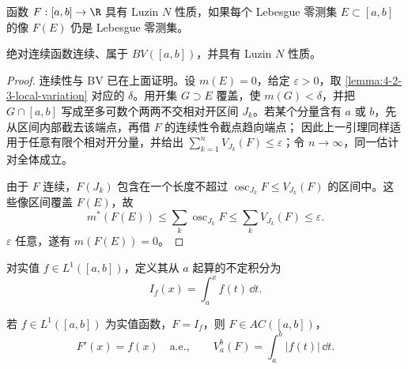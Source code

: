 \begin{definition}[Luzin $N$ 性质]\label{def:4-2-3-2}
函数 $F:[a,b]\to\R$ 具有 Luzin $N$ 性质，如果每个 Lebesgue 零测集 $E\subset[a,b]$
的像 $F(E)$ 仍是 Lebesgue 零测集。
\end{definition}

\begin{proposition}[绝对连续函数的基本性质]\label{proposition:4-2-3-ac-basic}
绝对连续函数连续、属于 $BV([a,b])$，并具有 Luzin $N$ 性质。
\end{proposition}

\begin{proof}
连续性与 BV 已在上面证明。设 $m(E)=0$，给定 $\varepsilon>0$，取
\cref{lemma:4-2-3-local-variation} 对应的 $\delta$。用开集
$G\supset E$ 覆盖，使 $m(G)<\delta$，并把 $G\cap[a,b]$ 写成至多可数个两两不交相对开区间
$J_k$。若某个分量含有 $a$ 或 $b$，先从区间内部截去该端点，再借 $F$ 的连续性令截点趋向端点；
因此上一引理同样适用于任意有限个相对开分量，并给出
$\sum_{k=1}^nV_{J_k}(F)\le\varepsilon$；令 $n\to\infty$，同一估计对全体成立。

由于 $F$ 连续，$F(J_k)$ 包含在一个长度不超过
$\operatorname{osc}_{J_k}F\le V_{J_k}(F)$ 的区间中。这些像区间覆盖 $F(E)$，故
\[
 m^*(F(E))\le\sum_k\operatorname{osc}_{J_k}F
 \le\sum_kV_{J_k}(F)\le\varepsilon.
\]
$\varepsilon$ 任意，遂有 $m(F(E))=0$。
\end{proof}

\begin{definition}[不定积分]\label{def:4-2-3-3}
对实值 $f\in L^1([a,b])$，定义其从 $a$ 起算的不定积分为
\[
 I_f(x)=\int_a^xf(t)\,\dd t.
\]
\end{definition}

\begin{theorem}\label{theorem:4-2-3-1}
若 $f\in L^1([a,b])$ 为实值函数，$F=I_f$，则 $F\in AC([a,b])$，
\[
 F'(x)=f(x)\quad\text{a.e.},
 \qquad
 V_a^b(F)=\int_a^b|f(t)|\,\dd t.
\]
\end{theorem}

